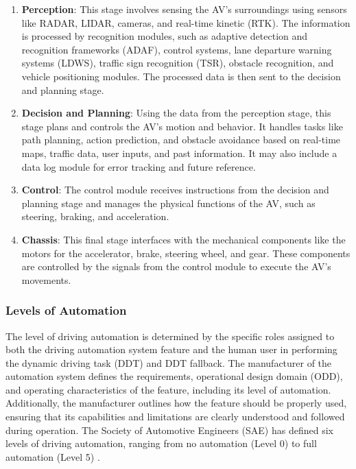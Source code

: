 \begin{enumerate}
    \item \textbf{Perception}: This stage involves sensing the AV's surroundings using sensors like RADAR, LIDAR, cameras, and real-time kinetic (RTK). The information is processed by recognition modules, such as adaptive detection and recognition frameworks (ADAF), control systems, lane departure warning systems (LDWS), traffic sign recognition (TSR), obstacle recognition, and vehicle positioning modules. The processed data is then sent to the decision and planning stage.
    \item \textbf{Decision and Planning}: Using the data from the perception stage, this stage plans and controls the AV's motion and behavior. It handles tasks like path planning, action prediction, and obstacle avoidance based on real-time maps, traffic data, user inputs, and past information. It may also include a data log module for error tracking and future reference.
    \item \textbf{Control}: The control module receives instructions from the decision and planning stage and manages the physical functions of the AV, such as steering, braking, and acceleration.
    \item \textbf{Chassis}: This final stage interfaces with the mechanical components like the motors for the accelerator, brake, steering wheel, and gear. These components are controlled by the signals from the control module to execute the AV’s movements.
\end{enumerate}

\subsubsection{Levels of Automation}\label{subsubsec:levels-of-automation}
The level of driving automation is determined by the specific roles assigned to both the driving automation system feature and the human user in performing the dynamic driving task (DDT) and DDT fallback. \cite{sae_j3016_2021}
The manufacturer of the automation system defines the requirements, operational design domain (ODD), and operating characteristics of the feature, including its level of automation.
Additionally, the manufacturer outlines how the feature should be properly used, ensuring that its capabilities and limitations are clearly understood and followed during operation.
The Society of Automotive Engineers (SAE) has defined six levels of driving automation, ranging from no automation (Level 0) to full automation (Level 5) \cite{sae_j3016_2021}.

